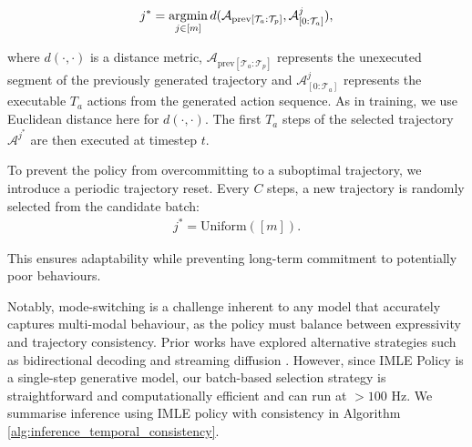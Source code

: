 \begin{align}
j^* = \operatorname*{argmin}_{j \in [m]} d(\mathcal{A}_{\text{prev}[\mathcal{T}_{a}:\mathcal{T}_{p}]}, \mathcal{A}^j_{[0:\mathcal{T}_{a}]}),
\end{align}

\noindent where \( d(\cdot, \cdot) \) is a distance metric, \( \mathcal{A}_{\text{prev}[\mathcal{T}_{a}:\mathcal{T}_{p}]} \) represents the unexecuted segment of the previously generated trajectory and  \( \mathcal{A}^j_{[0:\mathcal{T}_{a}]} \) represents the executable $T_a$ actions from the generated action sequence. As in training, we use Euclidean distance here for $d(\cdot,\cdot)$. The first $T_a$ steps of the selected trajectory \( \mathcal{A}^{j^*} \) are then executed at timestep \( t \).  

To prevent the policy from overcommitting to a suboptimal trajectory, we introduce a periodic trajectory reset. Every \( C \) steps, a new trajectory is randomly selected from the candidate batch:
\begin{align}
j^* = \text{Uniform}([m]).
\end{align}

\noindent This ensures adaptability while preventing long-term commitment to potentially poor behaviours.  

Notably, mode-switching is a challenge inherent to any model that accurately captures multi-modal behaviour, as the policy must balance between expressivity and trajectory consistency. Prior works have explored alternative strategies such as bidirectional decoding and streaming diffusion   \cite{liu2024bidirectional,høeg2024streamingdiffusionpolicyfast}. However, since IMLE Policy is a single-step generative model, our batch-based selection strategy is straightforward and computationally efficient and can run at $>100$ Hz.
We summarise inference using IMLE policy with consistency in Algorithm \ref{alg:inference_temporal_consistency}.
